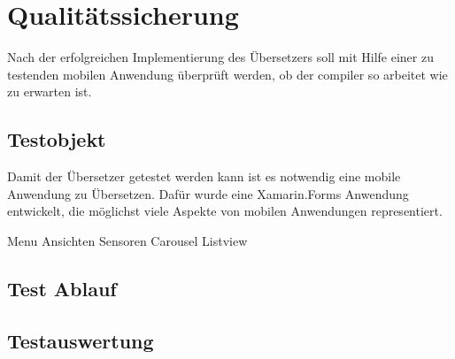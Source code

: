 \chapter{Qualitätssicherung}
\label{chap:Qualitätssicherung}

Nach der erfolgreichen Implementierung des Übersetzers soll mit Hilfe einer zu testenden mobilen Anwendung überprüft werden,  ob der compiler so arbeitet wie zu erwarten ist.  

\section{Testobjekt}
Damit der Übersetzer getestet werden kann ist es notwendig eine mobile Anwendung zu Übersetzen.  Dafür wurde eine Xamarin.Forms Anwendung entwickelt,  die möglichst viele Aspekte von mobilen Anwendungen representiert. 


Menu
Ansichten
Sensoren
Carousel
Listview

\section{Test Ablauf}




\section{Testauswertung}


